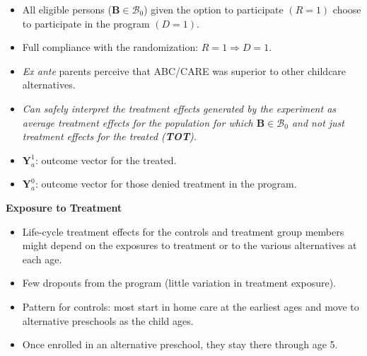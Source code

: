 \documentclass[static]{JJH-Beamer}
\begin{document}
\begin{frame}

\begin{itemize}
\item All eligible persons ($\bm{B}\in\mathcal{B}_0$) given the option to participate $(R=1)$ choose to participate in the program $(D=1)$.
\item Full compliance with the randomization: $R=1 \Rightarrow D=1$.
\item \emph{Ex ante} parents perceive that ABC/CARE was superior to other childcare alternatives.
\item \emph{Can safely interpret the treatment effects generated by the experiment as average treatment effects for the population for which $\bm{B}\in\mathcal{B}_0$ and not just treatment effects for the treated (\textbf{TOT}).}
\end{itemize}

\end{frame}

\begin{frame}

\begin{itemize}
\item $\bm{Y}^1_a$: outcome vector for the treated.
\item $\bm{Y}^0_a$: outcome vector for those denied treatment in the program.
\end{itemize}

\end{frame}

\begin{frame}

\begin{center}
\textbf{Exposure to Treatment}
\end{center}

\end{frame}

\begin{frame}

\begin{itemize}
\item Life-cycle treatment effects for the controls and treatment group members might depend on the exposures to treatment or to the various alternatives at each age.
\item Few dropouts from the program (little variation in treatment exposure).
\item Pattern for controls: most start in home care at the earliest ages and move to alternative preschools as the child ages.
\item Once enrolled in an alternative preschool, they stay there through age 5.
\end{itemize}

\end{frame}
\end{document}
